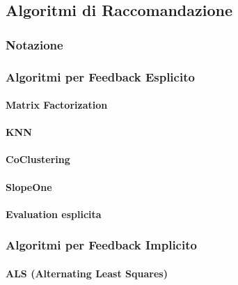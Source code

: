 \subsection{Algoritmi di
Raccomandazione}\label{algoritmi-di-raccomandazione}

\subsubsection{Notazione}\label{notazione}

\subsubsection{Algoritmi per Feedback
Esplicito}\label{algoritmi-per-feedback-esplicito}

\paragraph{Matrix Factorization}\label{matrix-factorization}

\paragraph{KNN}\label{knn}

\paragraph{CoClustering}\label{coclustering}

\paragraph{SlopeOne}\label{slopeone}

\paragraph{Evaluation esplicita}\label{evaluation-esplicita}

\subsubsection{Algoritmi per Feedback
Implicito}\label{algoritmi-per-feedback-implicito}

\paragraph{ALS (Alternating Least
Squares)}\label{als-alternating-least-squares}


